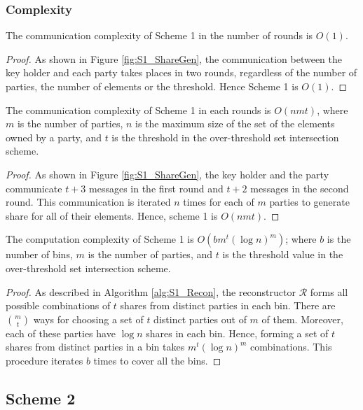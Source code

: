 \subsubsection{Complexity}
\begin{theorem}
The communication complexity of Scheme 1 in the number of rounds is $O(1)$. 
\end{theorem}
\begin{proof}
As shown in Figure \ref{fig:S1_ShareGen}, the communication between the key holder and each party takes places in two rounds, regardless of the number of parties, the number of elements or the threshold. Hence Scheme 1 is $O(1)$. 
\end{proof}
\begin{theorem}
The communication complexity of Scheme 1 in each rounds is $O(nmt)$, where $m$ is the number of parties, $n$ is the maximum size of the set of the elements owned by a party, and $t$ is the threshold in the over-threshold set intersection scheme.  
\end{theorem}
\begin{proof}
As shown in Figure \ref{fig:S1_ShareGen}, the key holder and the party communicate $t+3$ messages in the first round and $t+2$ messages in the second round. This communication is iterated $n$ times for each of $m$ parties to generate share for all of their elements. Hence, scheme 1 is $O(nmt)$.  
\end{proof}
\begin{theorem}\label{S1_ComputationComplexity}
The computation complexity of Scheme 1 is $O(b m^t (\log{n})^m)$; where $b$ is the number of bins, $m$ is the number of parties, and $t$ is the threshold value in the over-threshold set intersection scheme.
\end{theorem}
\begin{proof}
As described in Algorithm \ref{alg:S1_Recon}, the reconstructor $\mathcal{R}$ forms all possible combinations of $t$ shares from distinct parties in each bin. There are $m \choose t$ ways for choosing a set of $t$ distinct parties out of $m$ of them. Moreover, each of these parties have $\log{n}$ shares in each bin. Hence, forming a set of $t$ shares from distinct parties in a bin takes $m^t (\log{n})^m$ combinations. This procedure iterates $b$ times to cover all the bins.  
\end{proof}

\subsection{Scheme 2}
